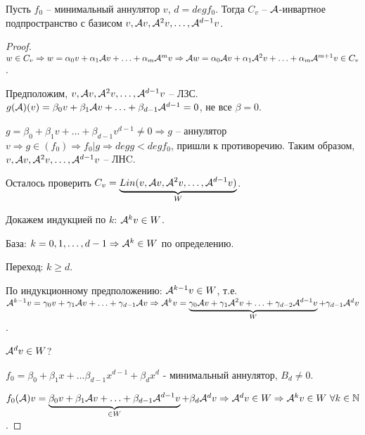 \documentclass[main]{subfiles}
\begin{document}
\begin{proposition}
    Пусть $f_0$ -- минимальный аннулятор $v$, $d = deg f_0$. Тогда $C_v$ -- $\mathcal{A}$-инвартное подпространство с базисом
    $v, \mathcal{A} v, {\mathcal{A}}^2 v, \ldots, {\mathcal{A}}^{d-1} v$.
\end{proposition}

\begin{proof}
    $w \in C_v \Rightarrow w = \alpha_0 v + \alpha_1 \mathcal{A} v + \ldots + \alpha_m {\mathcal{A}}^{m} v \Rightarrow
        \mathcal{A} w = \alpha_0 \mathcal{A} v + \alpha_1 {\mathcal{A}}^2 v + \ldots + \alpha_m {\mathcal{A}}^{m+1} v \in C_v$.

    Предположим, $v, \mathcal{A} v, {\mathcal{A}}^2 v, \ldots, {\mathcal{A}}^{d-1} v$ -- ЛЗС. $g(\mathcal{A})(v) = \beta_0 v + \beta_1 \mathcal{A} v + \ldots + \beta_{d-1} {\mathcal{A}}^{d-1} = 0$, не все $\beta = 0$.

    $g = \beta_0 + \beta_1 v + \ldots + \beta_{d-1} v^{d-1} \neq 0 \Rightarrow
        g$ -- аннулятор $v \Rightarrow g \in (f_0) \Rightarrow f_0|g \Rightarrow deg g < deg f_0$, пришли к противоречию.
    Таким образом, $v, \mathcal{A} v, {\mathcal{A}}^2 v, \ldots, {\mathcal{A}}^{d-1} v$ -- ЛНC.

    Осталось проверить $C_v = \underbrace{Lin(v, \mathcal{A} v, {\mathcal{A}}^2 v, \ldots, {\mathcal{A}}^{d-1} v)}_{W}$.

    Докажем индукцией по $k$: ${\mathcal{A}}^{k} v \in W$.

    База: $k = 0, 1, \ldots, d-1 \Rightarrow {\mathcal{A}}^k \in W$ по определению.

    Переход: $k\geq d$.

    По индукционному предположению: ${\mathcal{A}}^{k-1} v \in W$,
    т.е. ${\mathcal{A}}^{k-1}v = \gamma_0 v + \gamma_1 \mathcal{A} v + \ldots + \gamma_{d-1} \mathcal{A} v \Rightarrow
        {\mathcal{A}}^k v = \underbrace{\gamma_0 \mathcal{A} v + \gamma_1 {\mathcal{A}}^2 v + \ldots + \gamma_{d-2} {\mathcal{A}}^{d-1} v}_{W} + \gamma_{d-1} {\mathcal{A}}^d v$.

    ${\mathcal{A}}^d v \in W$?

    $f_0 = \beta_0 + \beta_1 x + \ldots \beta_{d-1} x^{d-1} + \beta_d x^d$ - минимальный аннулятор, $B_d \neq 0$.

    $f_0(\mathcal{A}) v = \underbrace{\beta_0 v +\beta_1 \mathcal{A} v + \ldots + \beta_{d-1} {\mathcal{A}}^{d-1} v}_{\in W} + \beta_d {\mathcal{A}}^d v \Rightarrow {\mathcal{A}}^d v \in W \Rightarrow
        {\mathcal{A}}^k v \in W \ \forall k \in \mathbb{N}$.

\end{proof}
\end{document}
